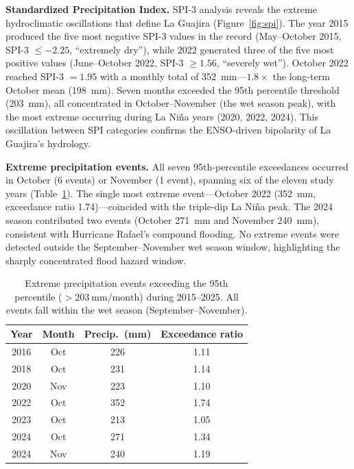 \documentclass{article}
\begin{document}
\textbf{Standardized Precipitation Index.} SPI-3 analysis reveals the extreme hydroclimatic oscillations that define La Guajira (Figure~\ref{fig:spi}). The year 2015 produced the five most negative SPI-3 values in the record (May--October 2015, SPI-3 $\leq -2.25$, ``extremely dry''), while 2022 generated three of the five most positive values (June--October 2022, SPI-3 $\geq 1.56$, ``severely wet''). October 2022 reached SPI-3 $= 1.95$ with a monthly total of \SI{352}{\milli\metre}---$1.8\times$ the long-term October mean (\SI{198}{\milli\metre}). Seven months exceeded the 95th percentile threshold (\SI{203}{\milli\metre}), all concentrated in October--November (the wet season peak), with the most extreme occurring during La Ni\~na years (2020, 2022, 2024). This oscillation between SPI categories confirms the ENSO-driven bipolarity of La Guajira's hydrology.

\textbf{Extreme precipitation events.} All seven 95th-percentile exceedances occurred in October (6 events) or November (1 event), spanning six of the eleven study years (Table~\ref{tab:extremes}). The single most extreme event---October 2022 (\SI{352}{\milli\metre}, exceedance ratio 1.74)---coincided with the triple-dip La Ni\~na peak. The 2024 season contributed two events (October \SI{271}{\milli\metre} and November \SI{240}{\milli\metre}), consistent with Hurricane Rafael's compound flooding. No extreme events were detected outside the September--November wet season window, highlighting the sharply concentrated flood hazard window.

\begin{table}[htbp]
\caption{Extreme precipitation events exceeding the 95th percentile ($>\SI{203}{\milli\metre/\text{month}}$) during 2015--2025. All events fall within the wet season (September--November).}
\label{tab:extremes}
\centering
\footnotesize
\begin{tabular}{cccc}
\toprule
\textbf{Year} & \textbf{Month} & \textbf{Precip.\ (mm)} & \textbf{Exceedance ratio} \\
\midrule
2016 & Oct & 226 & 1.11 \\
2018 & Oct & 231 & 1.14 \\
2020 & Nov & 223 & 1.10 \\
2022 & Oct & 352 & 1.74 \\
2023 & Oct & 213 & 1.05 \\
2024 & Oct & 271 & 1.34 \\
2024 & Nov & 240 & 1.19 \\
\bottomrule
\end{tabular}
\end{table}
\end{document}
